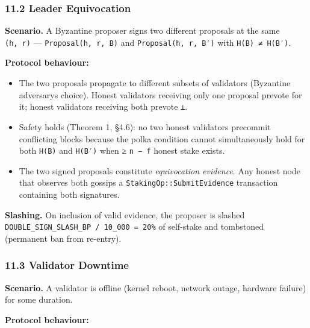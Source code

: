 \documentclass[11pt,a4paper]{article}
\providecommand{\tightlist}{\setlength{\itemsep}{0pt}\setlength{\parskip}{0pt}}
\begin{document}
\hypertarget{112-leader-equivocation}{%
\subsubsection{11.2 Leader Equivocation}\label{112-leader-equivocation}}

\textbf{Scenario.} A Byzantine proposer signs two different proposals at
the same \texttt{(h,\ r)} --- \texttt{Proposal(h,\ r,\ B)} and
\texttt{Proposal(h,\ r,\ B′)} with \texttt{H(B)\ ≠\ H(B′)}.

\textbf{Protocol behaviour:}

\begin{itemize}
\tightlist
\item
  The two proposals propagate to different subsets of validators
  (Byzantine adversary\textquotesingle s choice). Honest validators
  receiving only one proposal prevote for it; honest validators
  receiving both prevote \texttt{⊥}.
\item
  Safety holds (Theorem 1, §4.6): no two honest validators precommit
  conflicting blocks because the polka condition cannot simultaneously
  hold for both \texttt{H(B)} and \texttt{H(B′)} when ≥ \texttt{n\ −\ f}
  honest stake exists.
\item
  The two signed proposals constitute \emph{equivocation evidence}. Any
  honest node that observes both gossips a
  \texttt{StakingOp::SubmitEvidence} transaction containing both
  signatures.
\end{itemize}

\textbf{Slashing.} On inclusion of valid evidence, the proposer is
slashed \texttt{DOUBLE\_SIGN\_SLASH\_BP\ /\ 10\_000\ =\ 20\%} of
self-stake and tombstoned (permanent ban from re-entry).

\hypertarget{113-validator-downtime}{%
\subsubsection{11.3 Validator Downtime}\label{113-validator-downtime}}

\textbf{Scenario.} A validator is offline (kernel reboot, network
outage, hardware failure) for some duration.

\textbf{Protocol behaviour:}
\end{document}
